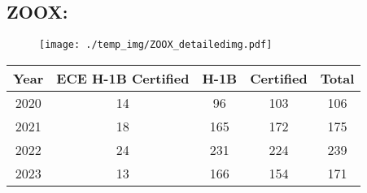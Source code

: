 \documentclass{article}%
\begin{document}
%
\newpage%
\subsection{ZOOX:}%
\label{subsec:ZOOX}%
\label{ZOOXdetailed}%


\begin{figure}[htbp]%
\centering%
\texttt{[image: ./temp\_img/ZOOX\_detailedimg.pdf]}%
\end{figure}

%
\begin{longtable}{c|c|c|c|c}%
\hline%
Year&ECE H{-}1B Certified&H{-}1B&Certified&Total\\%
\hline%
2020&14&96&103&106\\%
\hline%
2021&18&165&172&175\\%
\hline%
2022&24&231&224&239\\%
\hline%
2023&13&166&154&171\\%
\hline%
\end{longtable}

%
\newpage

%
\end{document}

